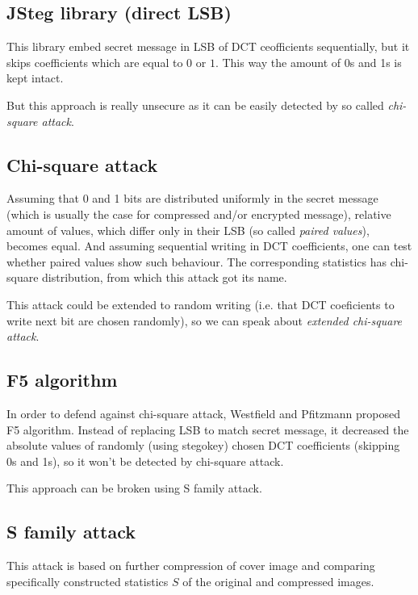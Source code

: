 \subsection{JSteg library (direct LSB)}

This library embed secret message in LSB of DCT ceofficients sequentially,
but it skips coefficients which are equal to $0$ or $1$. This way the amount
of 0s and 1s is kept intact.

But this approach is really unsecure as it can be easily detected by so called
\textit{chi-square attack}.

\subsection{Chi-square attack}

Assuming that 0 and 1 bits are distributed uniformly in the secret message 
(which is usually the case for compressed and/or encrypted message), relative
amount of values, which differ only in their LSB (so called \textit{paired values}),
becomes equal. And assuming sequential writing in DCT coefficients, one can test
whether paired values show such behaviour. The corresponding statistics has chi-square
distribution, from which this attack got its name.

This attack could be extended to random writing (i.e. that DCT coeficients to write next bit
are chosen randomly), so we can speak about \textit{extended chi-square attack}.

\subsection{F5 algorithm}

In order to defend against chi-square attack, Westfield and Pfitzmann proposed F5 algorithm.
Instead of replacing LSB to match secret message, it decreased the absolute values of randomly 
(using stegokey) chosen DCT coefficients (skipping 0s and 1s), so it won't be detected by
chi-square attack.

This approach can be broken using S family attack.

\subsection{S family attack}

This attack is based on further compression of cover image and comparing 
specifically constructed statistics $S$ of the original and compressed images.

